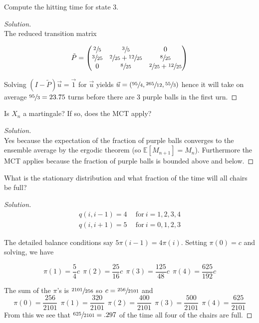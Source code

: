 \documentclass[12pt]{article}
\newenvironment{problem}[2][Problem]{\begin{trivlist}
\item[\hskip \labelsep {\bfseries #1}\hskip \labelsep {\bfseries #2.}]}{\end{trivlist}}
\newenvironment{solution}
  {\begin{proof}[Solution]\renewcommand{\qedsymbol}{}}
  {\end{proof}}
\begin{document}
\begin{problem}{1(d)}
Compute the hitting time for state 3.
\end{problem}
 
\begin{solution}\ \\ 

The reduced transition matrix

$$ \tilde{P} =
\begin{pmatrix}
\sfrac{2}{5} & \sfrac{3}{5} & 0 \\
\sfrac{3}{25} & \sfrac{2}{25}+\sfrac{12}{25} & \sfrac{8}{25} \\
0 & \sfrac{8}{25} & \sfrac{2}{25}+\sfrac{12}{25} \\
\end{pmatrix}
$$

Solving $(I-\tilde{P})\vec{u}=\vec{1}$ for $\vec{u}$ yields $\vec{u} = (\sfrac{95}{4},\sfrac{265}{12},\sfrac{55}{3})$ hence it will take on average $\sfrac{95}{3} = 23.75$ turns before there are 3 purple balls in the first urn.


\end{solution} 

\begin{problem}{1(e)} 
Is $X_n$ a martingale? If so, does the MCT apply?
\end{problem}
\begin{solution}\ \\

Yes because the expectation of the fraction of purple balls converges to the ensemble average by the ergodic theorem (so $\mathbb{E}[M_{n+1}]=M_n$). Furthermore the MCT applies because the fraction of purple balls is bounded above and below.

\end{solution}

\begin{problem}{2(a)} 
What is the stationary distribution and what fraction of the time will all chairs be full?
\end{problem}
\begin{solution}\ 
\begin{align*}
q(i,i-1)= 4 &~~ \text{for}~ i = 1,2,3,4 \\
q(i,i+1)= 5 &~~ \text{for}~ i = 0,1,2,3
\end{align*} 

The detailed balance conditions say $5\pi(i-1) = 4\pi(i)$. Setting $\pi(0)= c$ and solving, we have

$$
\pi(1) = \frac{5}{4}c ~~ \pi(2) = \frac{25}{16}c ~~ \pi(3) = \frac{125}{48}c ~~ \pi(4) = \frac{625}{192}c 
$$

The sum of the $\pi$’s is $\sfrac{2101}{256}$ so $c=\sfrac{256}{2101}$ and
$$
\pi(0)=\frac{256}{2101} ~~ \pi(1) = \frac{320}{2101} ~~ \pi(2) = \frac{400}{2101} ~~ \pi(3) = \frac{500}{2101} ~~ \pi(4) = \frac{625}{2101}
$$
From this we see that $\sfrac{625}{2101} = .297$ of the time all four of the chairs are full.
\end{solution}
\end{document}
